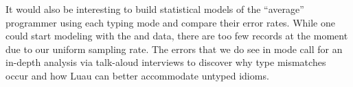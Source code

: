 \documentclass[english,submission,cleveref]{programming}
\begin{document}
It would also be interesting to build statistical models of
the ``average'' programmer using each typing mode and compare their error
rates.
While one could start modeling with the \mnocheck{} and \mnonstrict{}
data, there are too few \mstrict{} records at the moment due to our uniform
sampling rate.
The errors that we do see in \mstrict{} mode call for an in-depth analysis via
talk-aloud interviews to discover why type mismatches occur and how Luau
can better accommodate untyped idioms.






\newpage

% 
% 
% 
% 
% 
% 
% 
% 


\newpage


\end{document}
